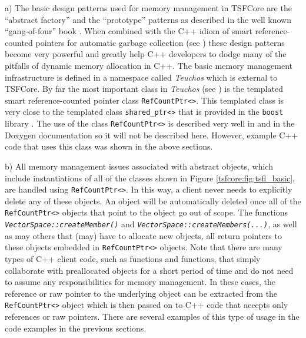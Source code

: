 a) The basic design patterns used for memory management in TSFCore are
the ``abstract factory'' and the ``prototype'' patterns as described
in the well known ``gang-of-four'' book {}\cite{ref:gama_et_al_1995}.
When combined with the C++ idiom of smart reference-counted pointers
for automatic garbage collection (see {}\cite[Items
28-29]{ref:meyers_1996}) these design patterns become very powerful
and greatly help C++ developers to dodge many of the pitfalls of
dynamic memory allocation in C++.  The basic memory management
infrastructure is defined in a namespace called {}\textit{Teuchos}
which is external to TSFCore.  By far the most important class in
{}\textit{Teuchos} (see {}\cite{ref:moochodevguide}) is the templated
smart reference-counted pointer class {}\texttt{RefCountPtr<>}.  This
templated class is very close to the templated class
{}\texttt{shared\_ptr<>} that is provided in the {}\texttt{boost}
library {}\cite{ref:boost}.  The use of the class
{}\texttt{RefCountPtr<>} is described very well in
{}\cite{ref:RefCountPtr} and in the Doxygen documentation so it will
not be described here.  However, example C++ code that uses this class
was shown in the above sections.

b) All memory management issues associated with abstract objects, which
include instantiations of all of the classes shown in Figure
{}\ref{tsfcore:fig:tsfl_basic}, are handled using
{}\texttt{RefCountPtr<>}.  In this way, a client never needs to
explicitly delete any of these objects.  An object will be
automatically deleted once all of the {}\texttt{RefCountPtr<>} objects
that point to the object go out of scope.  The functions
{}\texttt{\textit{VectorSpace\-::createMember()}} and
{}\texttt{\textit{VectorSpace\-::createMembers(...)}}, as well as may
others that (may) have to allocate new objects, all return pointers to
these objects embedded in {}\texttt{RefCountPtr<>} objects.  Note that
there are many types of C++ client code, such as functions and
functions, that simply collaborate with preallocated objects for a short
period of time and do not need to assume any responsibilities for
memory management.  In these cases, the reference or raw pointer to
the underlying object can be extracted from the
{}\texttt{RefCountPtr<>} object which is then passed on to C++ code
that accepts only references or raw pointers.  There are several
examples of this type of usage in the code examples in the previous
sections.


